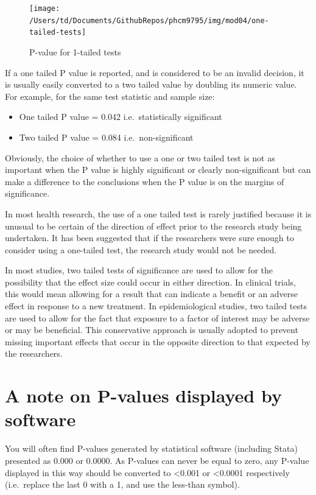 \documentclass[
]{memoir}
\providecommand{\tightlist}{%
  \setlength{\itemsep}{0pt}\setlength{\parskip}{0pt}}
\begin{document}
\begin{figure}
\texttt{[image: /Users/td/Documents/GithubRepos/phcm9795/img/mod04/one-tailed-tests]} \caption{P-value for 1-tailed tests}\label{fig:one-tailed-tests}
\end{figure}

If a one tailed P value is reported, and is considered to be an invalid decision, it is usually easily converted to a two tailed value by doubling its numeric value. For example, for the same test statistic and sample size:

\begin{itemize}
\tightlist
\item
  One tailed P value = 0.042 i.e.~statistically significant
\item
  Two tailed P value = 0.084 i.e.~non-significant
\end{itemize}

Obviously, the choice of whether to use a one or two tailed test is not as important when the P value is highly significant or clearly non-significant but can make a difference to the conclusions when the P value is on the margins of significance.

In most health research, the use of a one tailed test is rarely justified because it is unusual to be certain of the direction of effect prior to the research study being undertaken. It has been suggested that if the researchers were sure enough to consider using a one-tailed test, the research study would not be needed.

In most studies, two tailed tests of significance are used to allow for the possibility that the effect size could occur in either direction. In clinical trials, this would mean allowing for a result that can indicate a benefit or an adverse effect in response to a new treatment. In epidemiological studies, two tailed tests are used to allow for the fact that exposure to a factor of interest may be adverse or may be beneficial. This conservative approach is usually adopted to prevent missing important effects that occur in the opposite direction to that expected by the researchers.

\hypertarget{a-note-on-p-values-displayed-by-software}{%
\section{A note on P-values displayed by software}\label{a-note-on-p-values-displayed-by-software}}

You will often find P-values generated by statistical software (including Stata) presented as 0.000 or 0.0000. As P-values can never be equal to zero, any P-value displayed in this way should be converted to \textless0.001 or \textless0.0001 respectively (i.e.~replace the last 0 with a 1, and use the less-than symbol).
\end{document}
